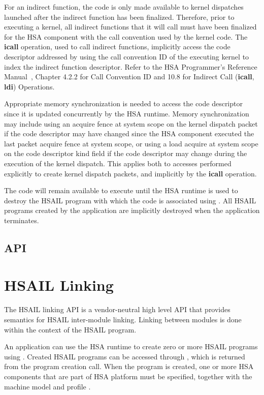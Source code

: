 \documentclass[final,oneside]{book}
\newcommand{\reffun}[1]{\textbf{#1}}
\newcommand{\refhsl}[1]{\reffun{#1}}
\begin{document}
For an indirect function, the code is only made available to kernel dispatches
launched after the indirect function has been finalized. Therefore, prior to
executing a kernel, all indirect functions that it will call must have been
finalized for the HSA component with the call convention used by the kernel
code. The \refhsl{icall} operation, used to call indirect functions, implicitly
access the code descriptor addressed by using the call convention ID of the
executing kernel to index the indirect function descriptor.  Refer to the HSA
Programmer's Reference Manual~\cite{prm}, Chapter 4.2.2 for Call Convention ID
and 10.8 for Indirect Call (\refhsl{icall}, \refhsl{ldi}) Operations.

Appropriate memory synchronization is needed to access the code descriptor since
it is updated concurrently by the HSA runtime. Memory synchronization may
include using an acquire fence at system scope on the kernel dispatch packet if
the code descriptor may have changed since the HSA component executed the last
packet acquire fence at system scope, or using a load acquire at system scope on
the code descriptor kind field if the code descriptor may change during the
execution of the kernel dispatch. This applies both to accesses performed
explicitly to create kernel dispatch packets, and implicitly by the
\refhsl{icall} operation.

The code will remain available to execute until the HSA runtime is used to
destroy the HSAIL program with which the code is associated using
. All HSAIL programs created by the application
are implicitly destroyed when the application terminates.

\subsection{API}


\section{HSAIL Linking}\label{linking}

The HSAIL linking API is a vendor-neutral high level API that provides semantics
for HSAIL inter-module linking. Linking between modules is done within the
context of the HSAIL program.

An application can use the HSA runtime to create zero or more HSAIL programs
using . Created HSAIL programs can be accessed
through , which is returned from the program
creation call.  When the program is created, one or more HSA components
 that are part of HSA platform must be specified, together
with the machine model  and profile
.
\end{document}
